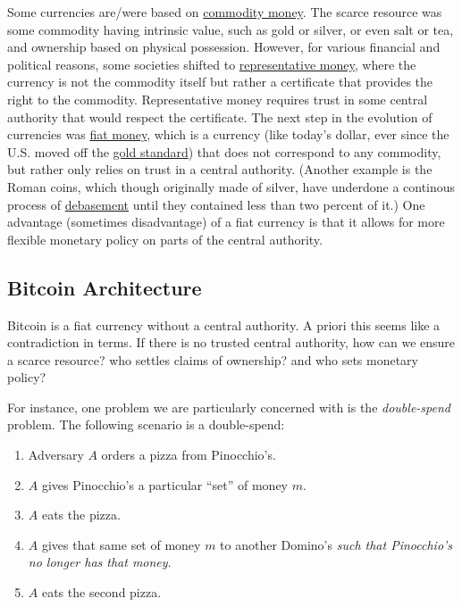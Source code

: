 Some currencies are/were based on \href{https://goo.gl/K7awAW}{commodity
money}. The scarce resource was some commodity having intrinsic value,
such as gold or silver, or even salt or tea, and ownership based on
physical possession. However, for various financial and political
reasons, some societies shifted to
\href{https://goo.gl/K6c4qP}{representative money}, where the currency
is not the commodity itself but rather a certificate that provides the
right to the commodity. Representative money requires trust in some
central authority that would respect the certificate. The next step in
the evolution of currencies was
\href{https://en.wikipedia.org/wiki/Fiat_money}{fiat money}, which is a
currency (like today's dollar, ever since the U.S. moved off the
\href{https://goo.gl/SPN5BS}{gold standard}) that does not correspond to
any commodity, but rather only relies on trust in a central authority.
(Another example is the Roman coins, which though originally made of
silver, have underdone a continous process of
\href{https://goo.gl/ZDkGzL}{debasement} until they contained less than
two percent of it.) One advantage (sometimes disadvantage) of a fiat
currency is that it allows for more flexible monetary policy on parts of
the central authority.

\subsection{Bitcoin Architecture}\label{Bitcoin-Architecture}

Bitcoin is a fiat currency without a central authority. A priori this
seems like a contradiction in terms. If there is no trusted central
authority, how can we ensure a scarce resource? who settles claims of
ownership? and who sets monetary policy?

For instance, one problem we are particularly concerned with is the
\emph{double-spend} problem. The following scenario is a double-spend:

\begin{enumerate}
\def\labelenumi{\arabic{enumi}.}
\tightlist
\item
  Adversary \(A\) orders a pizza from Pinocchio's.
\item
  \(A\) gives Pinocchio's a particular ``set'' of money \(m\).
\item
  \(A\) eats the pizza.
\item
  \(A\) gives that same set of money \(m\) to another Domino's
  \emph{such that Pinocchio's no longer has that money}.
\item
  \(A\) eats the second pizza.
\end{enumerate}

